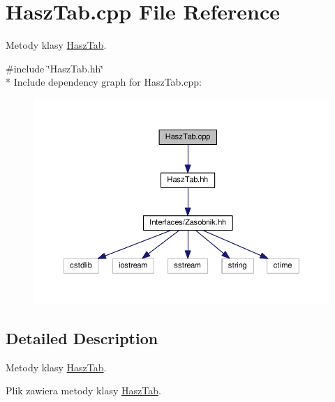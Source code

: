 \hypertarget{a00037}{}\section{Hasz\+Tab.\+cpp File Reference}
\label{a00037}


Metody klasy \hyperlink{a00010}{Hasz\+Tab}.  


{\ttfamily \#include \char`\"{}Hasz\+Tab.\+hh\char`\"{}}\\*
Include dependency graph for Hasz\+Tab.\+cpp\+:
\nopagebreak
\begin{figure}[H]
\begin{center}
\leavevmode
\includegraphics[width=350pt]{a00081}
\end{center}
\end{figure}


\subsection{Detailed Description}
Metody klasy \hyperlink{a00010}{Hasz\+Tab}. 

Plik zawiera metody klasy \hyperlink{a00010}{Hasz\+Tab}. 
